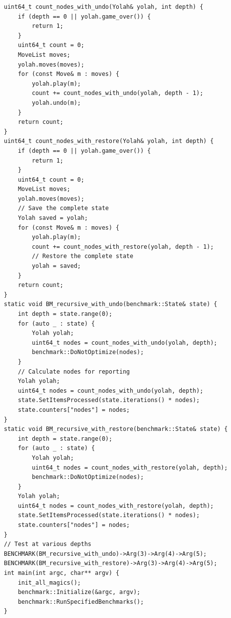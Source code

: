 \documentclass[12pt,a4paper,twoside,openright]{book}
\begin{document}
\begin{mdframed}[skipabove=\baselineskip,hidealllines=true]
\begin{verbatim}
uint64_t count_nodes_with_undo(Yolah& yolah, int depth) {
    if (depth == 0 || yolah.game_over()) {
        return 1;
    }
    uint64_t count = 0;
    MoveList moves;
    yolah.moves(moves);
    for (const Move& m : moves) {
        yolah.play(m);
        count += count_nodes_with_undo(yolah, depth - 1);
        yolah.undo(m);
    }
    return count;
}
uint64_t count_nodes_with_restore(Yolah& yolah, int depth) {
    if (depth == 0 || yolah.game_over()) {
        return 1;
    }
    uint64_t count = 0;
    MoveList moves;
    yolah.moves(moves);
    // Save the complete state
    Yolah saved = yolah;
    for (const Move& m : moves) {
        yolah.play(m);
        count += count_nodes_with_restore(yolah, depth - 1);
        // Restore the complete state
        yolah = saved;
    }
    return count;
}
static void BM_recursive_with_undo(benchmark::State& state) {
    int depth = state.range(0);
    for (auto _ : state) {
        Yolah yolah;
        uint64_t nodes = count_nodes_with_undo(yolah, depth);
        benchmark::DoNotOptimize(nodes);
    }
    // Calculate nodes for reporting
    Yolah yolah;
    uint64_t nodes = count_nodes_with_undo(yolah, depth);
    state.SetItemsProcessed(state.iterations() * nodes);
    state.counters["nodes"] = nodes;
}
static void BM_recursive_with_restore(benchmark::State& state) {
    int depth = state.range(0);
    for (auto _ : state) {
        Yolah yolah;
        uint64_t nodes = count_nodes_with_restore(yolah, depth);
        benchmark::DoNotOptimize(nodes);
    }
    Yolah yolah;
    uint64_t nodes = count_nodes_with_restore(yolah, depth);
    state.SetItemsProcessed(state.iterations() * nodes);
    state.counters["nodes"] = nodes;
}
// Test at various depths
BENCHMARK(BM_recursive_with_undo)->Arg(3)->Arg(4)->Arg(5);
BENCHMARK(BM_recursive_with_restore)->Arg(3)->Arg(4)->Arg(5);
int main(int argc, char** argv) {
    init_all_magics();
    benchmark::Initialize(&argc, argv);
    benchmark::RunSpecifiedBenchmarks();
}
\end{verbatim}
\label{lst:undo_vs_restore_bench}
\end{mdframed}
\end{document}

